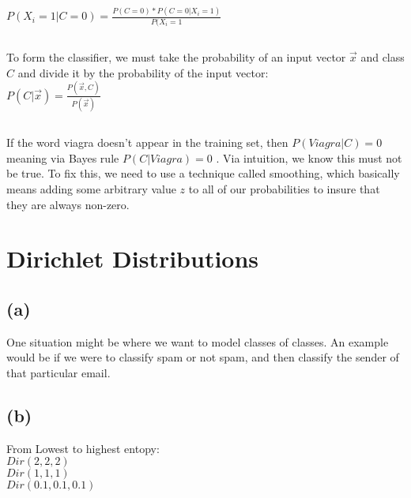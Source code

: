 \documentclass{article}
\begin{document}
$P(X_i=1 | C = 0) =  \frac{P(C=0) * P(C=0 | X_i=1) }{P(X_i = 1}$ \\


\subsection{}

To form the classifier, we must take the probability of an input vector $\vec{x}$ and class $C$ and divide it by the probability of the input vector:\\

$P(C|\vec{x}) = \frac{P(\vec{x},C)}{P(\vec{x})}$

\subsection{}

If the word viagra doesn't appear in the training set, then $P(Viagra | C) = 0$ meaning via Bayes rule $P(C | Viagra) = 0$ . Via intuition, we know this must not be true. To fix this, we need to use a technique called smoothing, which basically means adding some arbitrary value $z$ to all of our probabilities to insure that they are always non-zero.

\section{Dirichlet Distributions}

\subsection{(a)}

One situation might be where we want to model classes of classes. An example would be if we were to classify spam or not spam, and then classify the sender of that particular email.

\subsection{(b)}

From Lowest to highest entopy:\\
$Dir(2,2,2)$\\
$Dir(1,1,1)$\\
$Dir(0.1,0.1,0.1)$\\
\end{document}
